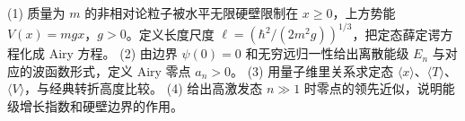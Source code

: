 (1) 质量为 \(m\) 的非相对论粒子被水平无限硬壁限制在 \(x\ge0\)，上方势能 \(V(x)=mgx\)，\(g>0\)。定义长度尺度 \(\ell=(\hbar^2/(2m^2g))^{1/3}\)，把定态薛定谔方程化成 Airy 方程。
(2) 由边界 \(\psi(0)=0\) 和无穷远归一性给出离散能级 \(E_n\) 与对应的波函数形式，定义 Airy 零点 \(a_n>0\)。
(3) 用量子维里关系求定态 \(\langle x\rangle\)、\(\langle T\rangle\)、\(\langle V\rangle\)，与经典转折高度比较。
(4) 给出高激发态 \(n\gg1\) 时零点的领先近似，说明能级增长指数和硬壁边界的作用。
